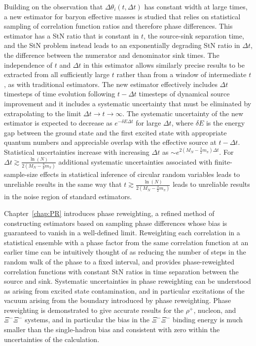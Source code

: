 Building on the observation that $\Delta \theta_i(t,\Delta t)$ has constant width at large times, 
a new estimator for baryon effective masses is studied 
that relies on statistical sampling of correlation function ratios and therefore phase differences.
This estimator has a StN ratio that is constant in $t$, the source-sink separation time, and the StN problem instead leads to an exponentially degrading StN ratio in $\Delta t$, the difference between the numerator and denominator sink times.
  The independence of $t$ and $\Delta t$ in this estimator allows similarly precise results to be extracted from all sufficiently large $t$ rather than from a window of intermediate $t$, as with traditional estimators.
  The new estimator effectively includes $\Delta t$ timesteps of time evolution following $t-\Delta t$ timesteps of dynamical source improvement and it includes a systematic uncertainty that must be eliminated by extrapolating to the limit $ \Delta t \rightarrow t \rightarrow \infty$.
  The systematic uncertainty of the new estimator is expected to decrease as $e^{-\delta E \Delta t}$ for large $\Delta t$, where $\delta E$ is the energy gap between the ground state and the first excited state with appropriate quantum numbers and appreciable overlap with the effective source at $t - \Delta t$.
  Statistical uncertainties increase with increasing $\Delta t$ as $\sim e^{2(M_N - \frac{3}{2}m_\pi)\Delta t}$.
  For $\Delta t \gtrsim \frac{\ln(N)}{2(M_N - \frac{3}{2}m_\pi)}$ additional systematic uncertainties associated with finite-sample-size effects in statistical inference of circular random variables leads to unreliable results in the same way that $t \gtrsim \frac{\ln (N)}{2(M_N - \frac{3}{2}m_\pi)}$ leads to unreliable results in the noise region of standard estimators.


Chapter~\ref{chap:PR} introduces phase reweighting, a refined method of constructing estimators based on sampling phase differences
whose bias is guaranteed to vanish in a well-defined limit.
Reweighting each correlation in a statistical ensemble with a phase factor from the same correlation function at an earlier time
can be intuitively thought of as reducing the number of steps in the random walk of the phase to a fixed interval,
and provides phase-reweighted correlation functions with constant StN ratios in time separation between the source and sink.
Systematic uncertainties in phase reweighting can be understood as arising from excited state contamination, and in particular excitations of the vacuum arising from the boundary introduced by phase reweighting.
Phase reweighting is demonstrated to give accurate results for the $\rho^+$, nucleon, and $\Xi^-\Xi^-$ systems, and in particular the bias in the $\Xi^-\Xi^-$ binding energy is much smaller than the single-hadron bias and consistent with zero within the uncertainties of the calculation.


